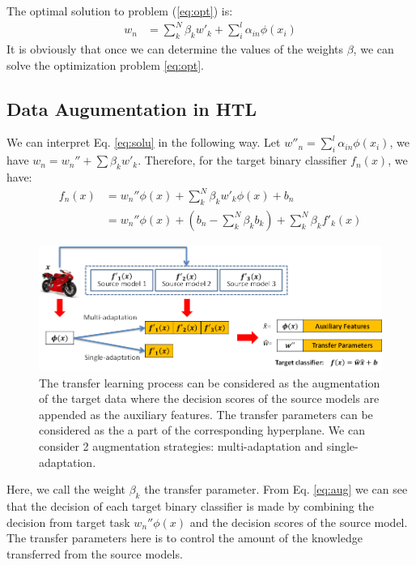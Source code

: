 The optimal solution to problem (\ref{eq:opt}) is:
\begin{equation}\label{eq:solu}
\begin{aligned}
{w_{n}}&= \sum\limits_k^N {{\beta _k}{{w'}_k}}  + \sum\limits_i^l {{\alpha _{in}}{\phi(x_i)}} 
\end{aligned}
\end{equation}
It is obviously that once we can determine the values of the weights $\beta$, we can solve the optimization problem \eqref{eq:opt}.

\subsection{Data Augumentation in HTL}
We can interpret Eq. \eqref{eq:solu} in the following way. Let $w''_n=\sum\limits_i^l {{\alpha _{in}}{\phi(x_i)}}$, we have $w_{n} = w_{n}''+\sum\limits{\beta _kw'_k}$. Therefore, for the target binary classifier $f_n(x)$, we have:
\begin{equation}\label{eq:aug_pre}
\begin{aligned}
f_n(x)&=w_{n}''\phi(x)+\sum\limits_k^N{\beta _kw'_k\phi(x)}+b_n\\
&=w_{n}''\phi(x)+(b_n-\sum\limits_k^N{\beta _kb_k})+\sum\limits_k^N{\beta _kf'_k(x)}
\end{aligned}
\end{equation}
\begin{figure}
\centering
\includegraphics[scale=0.7]{fig/aug2.png}
\caption{The transfer learning process can be considered as the augmentation of the target data where the decision scores of the source models are appended as the auxiliary features. The transfer parameters can be considered as the a part of the corresponding hyperplane. We can consider 2 augmentation strategies: multi-adaptation and single-adaptation.}\label{fig:aug}
\end{figure}
Here, we call the weight $\beta_k$ the transfer parameter. From Eq. \eqref{eq:aug} we can see that the decision of each target binary classifier is made by combining the decision from target task $w_{n}''\phi(x)$ and the decision scores of the source model. The transfer parameters here is to control the amount of the knowledge transferred from the source models.

